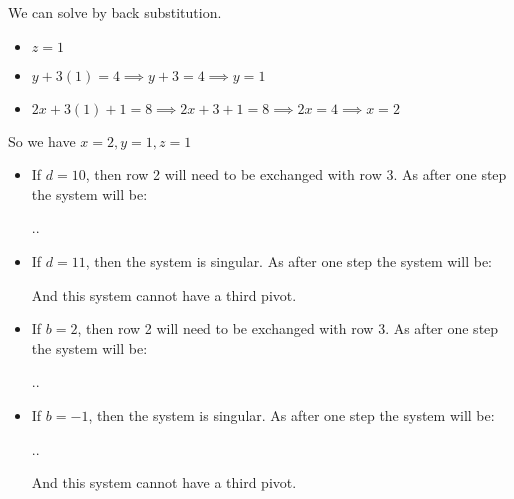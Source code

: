          We can solve by back substitution.

          \begin{itemize}
            \item $z = 1$
            \item $y + 3(1) = 4 \implies y + 3 = 4 \implies y = 1$
            \item $2x + 3(1) + 1 = 8 \implies 2x + 3 + 1 = 8 \implies 2x = 4 \implies x = 2$
          \end{itemize}

          So we have $x = 2, y = 1, z = 1$

        \item [12]
          \begin{itemize}
            \item

              If $d = 10$, then row 2 will need to be exchanged with row 3.
              As after one step the system will be:

              \sysdelim..

            \item

              If $d = 11$, then the system is singular.
              As after one step the system will be:


              And this system cannot have a third pivot.
          \end{itemize}

        \item [13]

          \begin{itemize}
            \item

              If $b = 2$, then row 2 will need to be exchanged with row 3.
              As after one step the system will be:

              \sysdelim..
            \item

              If $b = -1$, then the system is singular.
              As after one step the system will be:

              \sysdelim..

              And this system cannot have a third pivot.
          \end{itemize}

